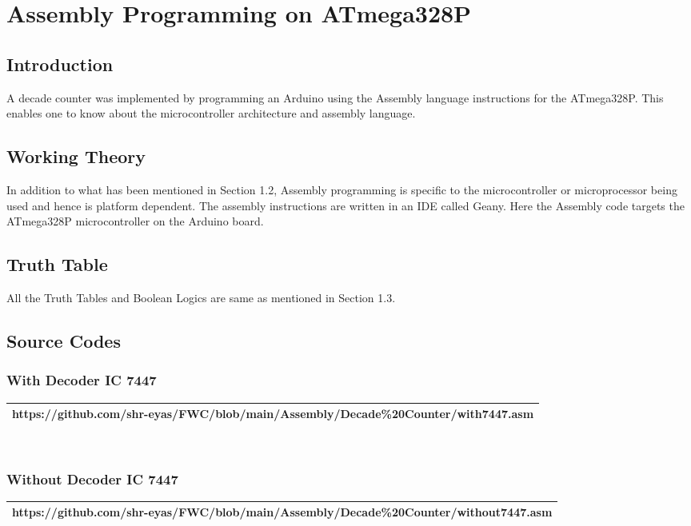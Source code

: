 \documentclass[journal,10pt]{article}
\begin{document}
\clearpage
\section{Assembly Programming on ATmega328P}

\subsection{Introduction}
A decade counter was implemented by programming an Arduino using the Assembly language instructions for the ATmega328P. This enables one to know about the microcontroller architecture and assembly language.

\subsection{Working Theory}
In addition to what has been mentioned in Section 1.2, Assembly programming is specific to the microcontroller or microprocessor being used and hence is platform dependent. The assembly instructions are written
in an IDE called Geany. Here the Assembly code targets the ATmega328P microcontroller on the Arduino board.

\subsection{Truth Table}
All the Truth Tables and Boolean Logics are same as mentioned in Section 1.3.

\subsection{Source Codes}
\subsubsection{With Decoder IC 7447}
    \begin{tabularx}{0.8\textwidth} { 
    | >{\centering\arraybackslash}X |}
    \hline
    https://github.com/shr-eyas/FWC/blob/main/Assembly/Decade\%20Counter/with7447.asm\\
    \hline
    \end{tabularx}
\\
\subsubsection{Without Decoder IC 7447}
    \begin{tabularx}{0.8\textwidth} { 
    | >{\centering\arraybackslash}X |}
    \hline
    https://github.com/shr-eyas/FWC/blob/main/Assembly/Decade\%20Counter/without7447.asm\\
    \hline
    \end{tabularx}
\\
\end{document}
